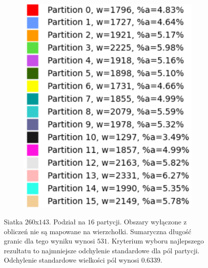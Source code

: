 \begin{figure}[h]
\centering
\begin{subfigure}{\textwidth}
    \centering
    \caption[short]{}
\end{subfigure}
\begin{subfigure}{\textwidth}
    \centering
    \caption[short]{}
\end{subfigure}
\begin{subfigure}{\textwidth}
    \centering
    \includegraphics[width=0.3\linewidth]{images/results/m_k/with/19/results}
    \caption[short]{}
\end{subfigure}
\caption{Siatka $260$x$143$. Podział na $16$ partycji.
Obszary wyłączone z obliczeń nie są mapowane na wierzchołki.
Sumaryczna długość granic dla tego wyniku wynosi $531$.
Kryterium wyboru najlepszego rezultatu to najmniejsze odchylenie standardowe dla pól partycji.
Odchylenie standardowe wielkości pól wynosi $0.6339$.}
\label{result:19}
\end{figure}
\FloatBarrier
